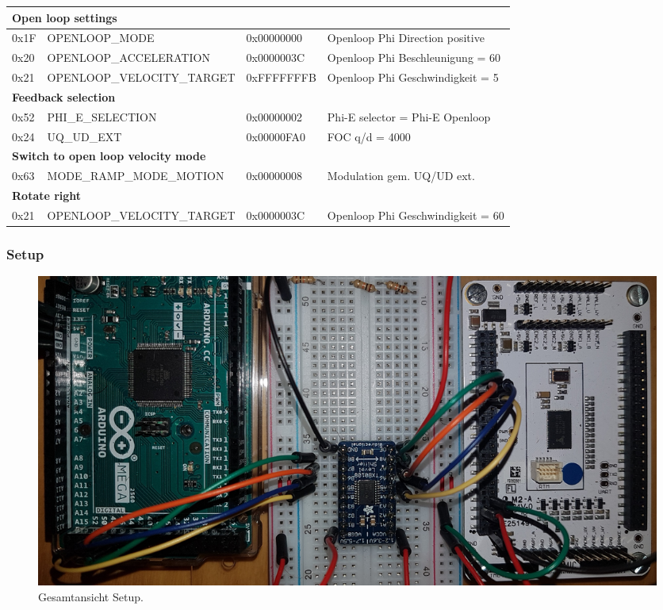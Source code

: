 \begin{table}[H]
\begin{tabularx}{\textwidth}{|l|l|l|X|}
\multicolumn{4}{|l|}{\textbf{Open loop settings}}                      \\ \hline
0x1F         & OPENLOOP\_MODE              & 0x00000000 & Openloop Phi Direction positive    \\ \hline
0x20         & OPENLOOP\_ACCELERATION      & 0x0000003C & Openloop Phi Beschleunigung = 60    \\ \hline
0x21         & OPENLOOP\_VELOCITY\_TARGET  & 0xFFFFFFFB & Openloop Phi Geschwindigkeit = 5    \\ \hline
\multicolumn{4}{|l|}{\textbf{Feedback selection}}                      \\ \hline
0x52         & PHI\_E\_SELECTION           & 0x00000002 & Phi-E selector = Phi-E Openloop    \\ \hline
0x24         & UQ\_UD\_EXT                 & 0x00000FA0 & FOC q/d = 4000  \\ \hline
\multicolumn{4}{|l|}{\textbf{Switch to open loop velocity mode}}       \\ \hline
0x63         & MODE\_RAMP\_MODE\_MOTION    & 0x00000008 & Modulation gem. UQ/UD ext. \\ \hline
\multicolumn{4}{|l|}{\textbf{Rotate right}}                            \\ \hline
0x21         & OPENLOOP\_VELOCITY\_TARGET  & 0x0000003C & Openloop Phi Geschwindigkeit = 60    \\ \hline
\end{tabularx}
\end{table}

\subsubsection{Setup}\label{Appendix:TMC4671_Setup}


\begin{figure}[H]
	\centering
	\includegraphics[angle=270,width=\textwidth]{graphics/1_komplett}
	\caption{Gesamtansicht Setup.}
	\label{fig:1_komplett}
\end{figure}

